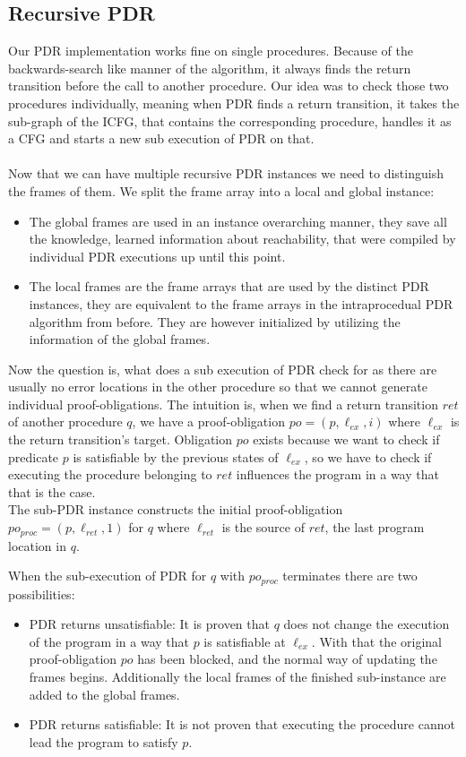 \documentclass{article}
\begin{document}
	\subsection{Recursive PDR}
	Our PDR implementation works fine on single procedures. Because of the backwards-search like manner of the algorithm, it always finds the return transition before the call to another procedure. Our idea was to check those two procedures individually, meaning when PDR finds a return transition, it takes the sub-graph of the ICFG, that contains the corresponding procedure, handles it as a CFG and starts a new sub execution of PDR on that. \\ \\
	Now that we can have multiple recursive PDR instances we need to distinguish the frames of them. We split the frame array into a local and global instance:
	\begin{itemize}
		\item The global frames are used in an instance overarching manner, they save all the knowledge, learned information about reachability, that were compiled by individual PDR executions up until this point.
		\item The local frames are the frame arrays that are used by the distinct PDR instances, they are equivalent to the frame arrays in the intraprocedual PDR algorithm from before. They are however initialized by utilizing the information of the global frames.
	\end{itemize}
	Now the question is, what does a sub execution of PDR check for as there are usually no error locations in the other procedure so that we cannot generate individual proof-obligations.
	The intuition is, when we find a return transition $ret$ of another procedure $q$, we have a proof-obligation $po = (p, \ell_{ex}, i)$ where $\ell_{ex}$ is the return transition's target. Obligation $po$ exists because we want to check if predicate $p$ is satisfiable by the previous states of $\ell_{ex}$, so we have to check if executing the procedure belonging to $ret$ influences the program in a way that that is the case. \\ The sub-PDR instance constructs the initial proof-obligation $po_{proc} = (p, \ell_{ret}, 1)$ for $q$ where $\ell_{ret}$ is the source of $ret$, the last program location in $q$. \\ \par
	When the sub-execution of PDR for $q$ with $po_{proc}$ terminates there are two possibilities: 
	\begin{itemize}
		\item PDR returns unsatisfiable: It is proven that $q$ does not change the execution of the program in a way that $p$ is satisfiable at $\ell_{ex}$. With that the original proof-obligation $po$ has been blocked, and the normal way of updating the frames begins. Additionally the local frames of the finished sub-instance are added to the global frames.
		\item PDR returns satisfiable: It is not proven that executing the procedure cannot lead the program to satisfy $p$. 
	\end{itemize}
\end{document}
